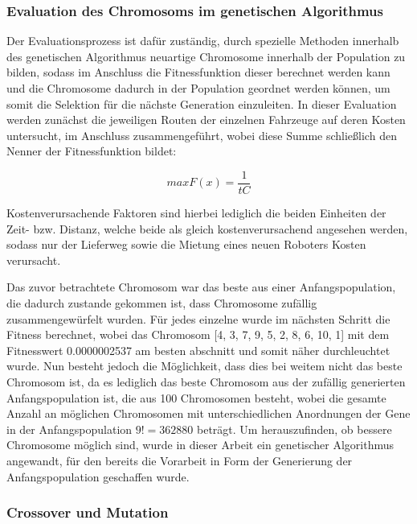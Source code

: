 \documentclass[a4paper,12pt,parskip,bibtotoc,liststotoc]{article}
\begin{document}
\subsubsection{Evaluation des Chromosoms im genetischen Algorithmus}

Der Evaluationsprozess ist dafür zuständig, durch spezielle Methoden innerhalb des genetischen Algorithmus neuartige Chromosome innerhalb der Population zu bilden, sodass im Anschluss die Fitnessfunktion dieser berechnet werden kann und die Chromosome dadurch in der Population geordnet werden können, um somit die Selektion für die nächste Generation einzuleiten.
In dieser Evaluation werden zunächst die jeweiligen Routen der einzelnen Fahrzeuge auf deren Kosten untersucht, im Anschluss zusammengeführt, wobei diese Summe schließlich den Nenner der Fitnessfunktion bildet:

\begin{equation}
max F(x) = \frac{1}{tC}
\end{equation}

Kostenverursachende Faktoren sind hierbei lediglich die beiden Einheiten der Zeit- bzw. Distanz, welche beide als gleich kostenverursachend angesehen werden, sodass nur der Lieferweg sowie die Mietung eines neuen Roboters Kosten verursacht.

Das zuvor betrachtete Chromosom war das beste aus einer Anfangspopulation, die dadurch zustande gekommen ist, dass Chromosome zufällig zusammengewürfelt wurden.
Für jedes einzelne wurde im nächsten Schritt die Fitness berechnet, wobei das Chromosom [4, 3, 7, 9, 5, 2, 8, 6, 10, 1] mit dem Fitnesswert 0.0000002537 am besten abschnitt und somit näher durchleuchtet wurde.
Nun besteht jedoch die Möglichkeit, dass dies bei weitem nicht das beste Chromosom ist, da es lediglich das beste Chromosom aus der zufällig generierten Anfangspopulation ist, die aus 100 Chromosomen besteht, wobei die gesamte Anzahl an möglichen Chromosomen mit unterschiedlichen Anordnungen der Gene in der Anfangspopulation $9! = 362880$ beträgt.
Um herauszufinden, ob bessere Chromosome möglich sind, wurde in dieser Arbeit ein genetischer Algorithmus angewandt, für den bereits die Vorarbeit in Form der Generierung der Anfangspopulation geschaffen wurde.

\subsubsection{Crossover und Mutation}
\end{document}
